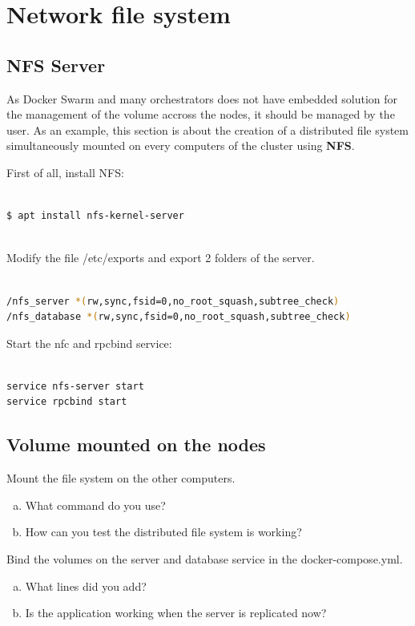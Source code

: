 \documentclass[a4paper,11pt]{exam}
\begin{document}
\clearpage

\section{Network file system}


\subsection{NFS Server}
As Docker Swarm and many orchestrators does not have embedded solution for the management of the volume accross the nodes, it should be managed by the user.
As an example, this section is about the creation of a distributed file system simultaneously mounted on every computers of the cluster using \textbf{NFS}.

First of all, install NFS:


\begin{lstlisting}[frame=single,language={sh}]  % Start your code-block

$ apt install nfs-kernel-server
			
\end{lstlisting}

Modify the file /etc/exports and export 2 folders of the server.

\begin{lstlisting}[frame=single,language={sh}]  % Start your code-block

/nfs_server *(rw,sync,fsid=0,no_root_squash,subtree_check)
/nfs_database *(rw,sync,fsid=0,no_root_squash,subtree_check)				
\end{lstlisting}

Start the nfc and rpcbind service: 

\begin{lstlisting}[frame=single,language={sh}]  % Start your code-block

service nfs-server start	
service rpcbind start			
\end{lstlisting}

\subsection{Volume mounted on the nodes}

\begin{questions}
	\question Mount the file system on the other computers.
	\begin{enumerate}[(a)]
		\item What command do you use?
		\item How can you test the distributed file system is working?
	\end{enumerate}
	\question Bind the volumes on the server and database service in the docker-compose.yml.
	\begin{enumerate}[(a)]
		\item What lines did you add?
		\item Is the application working when the server is replicated now?
	\end{enumerate}
\end{questions}
\end{document}
